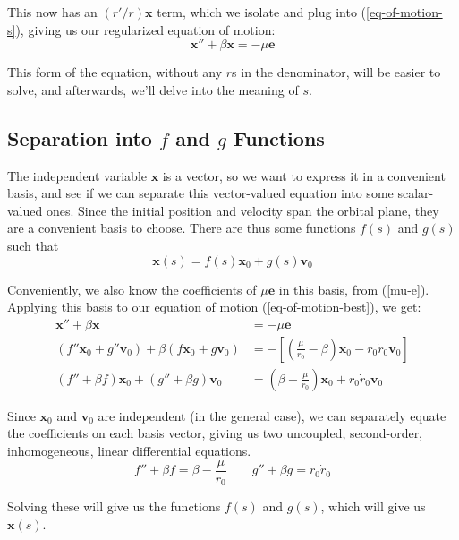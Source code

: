 \documentclass{article}
\numberwithin{equation}{subsection}
\begin{document}
This now has an $(r'/r)\bm x$ term, which we isolate and plug into (\ref{eq-of-motion-s}), giving us our regularized equation of motion:
\begin{equation}
\label{eq-of-motion-best}
\bm x'' + \beta \bm x = -\mu \bm e
\end{equation}

This form of the equation, without any $r$s in the denominator, will be easier to solve, and afterwards, we'll delve into the meaning of $s$.


\subsection{Separation into \texorpdfstring{$f$}{f} and \texorpdfstring{$g$}{g} Functions}

The independent variable $\bm x$ is a vector, so we want to express it in a convenient basis, and see if we can separate this vector-valued equation into some scalar-valued ones. Since the initial position and velocity span the orbital plane, they are a convenient basis to choose. There are thus some functions $f(s)$ and $g(s)$ such that
\begin{equation}
\bm x(s) = f(s) \bm x_0 + g(s) \bm v_0
\end{equation}

Conveniently, we also know the coefficients of $\mu \bm e$ in this basis, from (\ref{mu-e}). Applying this basis to our equation of motion (\ref{eq-of-motion-best}), we get:
\begin{align*}
\bm x'' + \beta \bm x &= -\mu \bm e \\
(f'' \bm x_0 + g'' \bm v_0) + \beta (f \bm x_0 + g \bm v_0) &= -\left[ \left( \frac{\mu}{r_0} - \beta \right) \bm x_0 - r_0 \dot{r}_0 \bm v_0 \right] \\
(f'' + \beta f) \bm x_0 + (g'' + \beta g) \bm v_0 &= \left( \beta - \frac{\mu}{r_0} \right) \bm x_0 + r_0 \dot{r}_0 \bm v_0
\end{align*}

Since $\bm x_0$ and $\bm v_0$ are independent (in the general case), we can separately equate the coefficients on each basis vector, giving us two uncoupled, second-order, inhomogeneous, linear differential equations.
\begin{equation}
\label{f-and-g-equations}
f'' + \beta f = \beta - \frac{\mu}{r_0}  \qquad  g'' + \beta g = r_0 \dot{r}_0
\end{equation}

Solving these will give us the functions $f(s)$ and $g(s)$, which will give us $\bm x(s)$.
\end{document}
